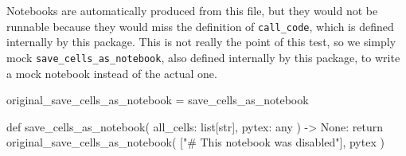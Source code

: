 \documentclass{book}
\begin{document}
Notebooks are automatically produced from this file, but they would not be runnable because they would miss the definition of \texttt{call\_code}, which is defined internally by this package. This is not really the point of this test, so we simply mock \texttt{save\_cells\_as\_notebook}, also defined internally by this package, to write a mock notebook instead of the actual one.

\begin{pycell}
original_save_cells_as_notebook = save_cells_as_notebook

def save_cells_as_notebook(
    all_cells: list[str], pytex: any
) -> None:
    return original_save_cells_as_notebook(
        ["\n# This notebook was disabled"], pytex
    )
\end{pycell}
\end{document}
